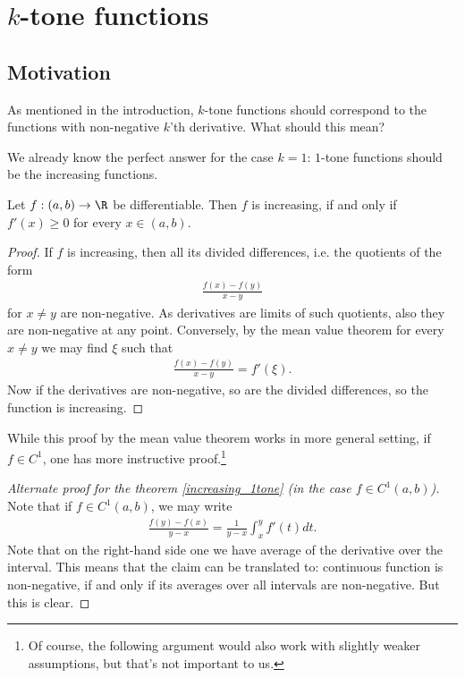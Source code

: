 \chapter{$k$-tone functions}

\section{Motivation}

As mentioned in the introduction, $k$-tone functions should correspond to the functions with non-negative $k$'th derivative. What should this mean?

We already know the perfect answer for the case $k = 1$: $1$-tone functions should be the increasing functions.

\begin{lause}\label{increasing_1tone}
	Let $f : (a, b) \to \R$ be differentiable. Then $f$ is increasing, if and only if $f'(x) \geq 0$ for every $x \in (a, b)$.
\end{lause}

\begin{proof}
	If $f$ is increasing, then all its divided differences, i.e. the quotients of the form
	\begin{align*}
		\frac{f(x) - f(y)}{x - y}
	\end{align*}
	for $x \neq y$ are non-negative. As derivatives are limits of such quotients, also they are non-negative at any point. Conversely, by the mean value theorem for every $x \neq y$ we may find $\xi$ such that
	\begin{align*}
		\frac{f(x) - f(y)}{x - y} = f'(\xi).
	\end{align*}
	Now if the derivatives are non-negative, so are the divided differences, so the function is increasing.
\end{proof}

While this proof by the mean value theorem works in more general setting, if $f \in C^{1}$, one has more instructive proof.\footnote{Of course, the following argument would also work with slightly weaker assumptions, but that's not important to us.}

\begin{proof}[Alternate proof for the theorem \ref{increasing_1tone} (in the case $f \in C^{1}(a, b)$)]
	Note that if $f \in C^{1}(a, b)$, we may write
	\begin{align*}
		\frac{f(y) - f(x)}{y - x} = \frac{1}{y - x}\int_{x}^{y} f'(t) dt.
	\end{align*}
	Note that on the right-hand side one we have average of the derivative over the interval. This means that the claim can be translated to: continuous function is non-negative, if and only if its averages over all intervals are non-negative. But this is clear.
\end{proof}

